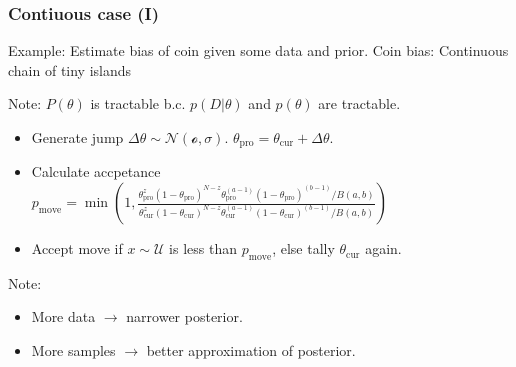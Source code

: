\documentclass[usenames,dvipsnames,table]{beamer}
\begin{document}
\begin{frame}
\frametitle{Contiuous case (I)}
Example: Estimate bias of coin given some data and prior.
Coin bias: Continuous chain of tiny islands

Note: $P(\theta)$ is tractable b.c. $p(D|\theta)$ and $p(\theta)$ are tractable.

\begin{itemize}
\item Generate jump $\Delta\theta \sim \mathcal{N(o, \sigma)}$. $\theta_{\mathrm{pro}} = \theta_{\mathrm{cur}}+\Delta\theta$.
\item Calculate accpetance $p_{\mathrm{move}} = \min\left(1,
    \frac{\theta_{\mathrm{pro}}^z(1-\theta_{\mathrm{pro}})^{N-z}
          \theta_{\mathrm{pro}}^(a-1)(1-\theta_{\mathrm{pro}})^(b-1) / B(a, b)
         }
         {\theta_{\mathrm{cur}}^z(1-\theta_{\mathrm{cur}})^{N-z}
          \theta_{\mathrm{cur}}^(a-1)(1-\theta_{\mathrm{cur}})^(b-1) / B(a, b)
         }\right)$
\item Accept move if $x \sim \mathcal{U}$ is less than $p_{\mathrm{move}}$, else tally $\theta_{\mathrm{cur}}$ again.
\end{itemize}

Note:
\begin{itemize}
\item More data $\to$ narrower posterior.
\item More samples $\to$ better approximation of posterior.
\end{itemize}
\end{frame}
\end{document}
